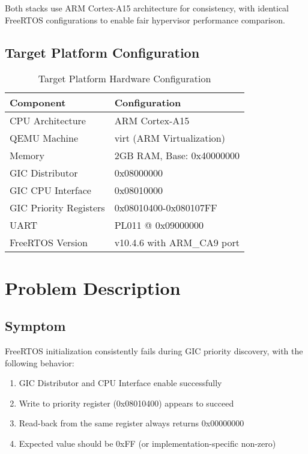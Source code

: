 \documentclass[12pt,a4paper]{article}
\begin{document}
Both stacks use ARM Cortex-A15 architecture for consistency, with identical FreeRTOS configurations to enable fair hypervisor performance comparison.

\subsection{Target Platform Configuration}

\begin{table}[htbp]
\centering
\begin{tabular}{@{}ll@{}}
\toprule
\textbf{Component} & \textbf{Configuration} \\
\midrule
CPU Architecture & ARM Cortex-A15 \\
QEMU Machine & virt (ARM Virtualization) \\
Memory & 2GB RAM, Base: 0x40000000 \\
GIC Distributor & 0x08000000 \\
GIC CPU Interface & 0x08010000 \\
GIC Priority Registers & 0x08010400-0x080107FF \\
UART & PL011 @ 0x09000000 \\
FreeRTOS Version & v10.4.6 with ARM\_CA9 port \\
\bottomrule
\end{tabular}
\caption{Target Platform Hardware Configuration}
\end{table}

\section{Problem Description}

\subsection{Symptom}

FreeRTOS initialization consistently fails during GIC priority discovery, with the following behavior:
\begin{enumerate}
    \item GIC Distributor and CPU Interface enable successfully
    \item Write to priority register (0x08010400) appears to succeed  
    \item Read-back from the same register always returns 0x00000000
    \item Expected value should be 0xFF (or implementation-specific non-zero)
\end{enumerate}
\end{document}

